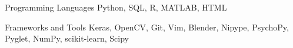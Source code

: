 

\begin{cvskills}

 \cvskill
  	{Programming Languages}
    {Python, SQL, R, MATLAB, HTML} %
  
 \cvskill
   {Frameworks and Tools}
   {Keras, OpenCV, Git, Vim, Blender, Nipype, PsychoPy, Pyglet, NumPy, scikit-learn, Scipy}
    

\end{cvskills}

